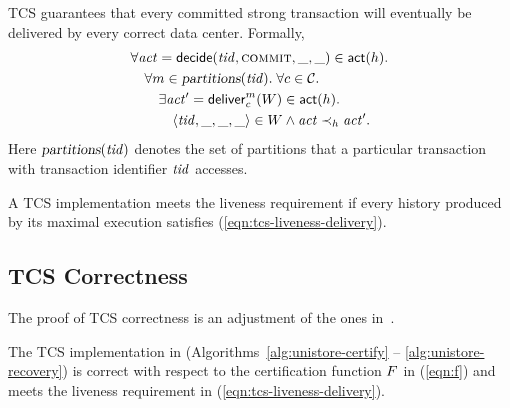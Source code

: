 TCS guarantees that every committed strong transaction
will eventually be delivered by every correct data center.
Formally,
\begin{align}
  &\forall \mathit{act} = {\sf decide}(\mathit{tid}, \textsc{commit}, \_, \_) \in {\sf act}(h).
    \nonumber\\
    &\quad \forall m \in \textsl{partitions}(\mathit{tid}).\; \forall c \in \mathcal{C}.
    \nonumber\\
    &\qquad \exists \mathit{act}' = {\sf deliver}^{m}_{c}(W) \in {\sf act}(h).\;
    \nonumber\\
      &\quad\qquad \langle \mathit{tid}, \_, \_, \_ \rangle \in W
        \land \mathit{act} \prec_{h} \mathit{act}'.
    \label{eqn:tcs-liveness-delivery}
\end{align}
Here $\textsl{partitions}(\mathit{tid})$ denotes the set of partitions
that a particular transaction with transaction identifier $\mathit{tid}$ accesses.

A TCS implementation meets the liveness requirement if
every history produced by its maximal execution satisfies (\ref{eqn:tcs-liveness-delivery}).
\subsection{TCS Correctness} \label{ss:tcs-correctness-unistore}

The proof of TCS correctness is an adjustment
of the ones in~\cite{discpaper, multicast-dsn19}.

\begin{apptheorem} \label{thm:tcs-correctness}
  The TCS implementation in \unistore{}
  (Algorithms~\ref{alg:unistore-certify} -- \ref{alg:unistore-recovery})
  is correct with respect to the certification function $F$ in (\ref{eqn:f})
  and meets the liveness requirement in (\ref{eqn:tcs-liveness-delivery}).
\end{apptheorem}
